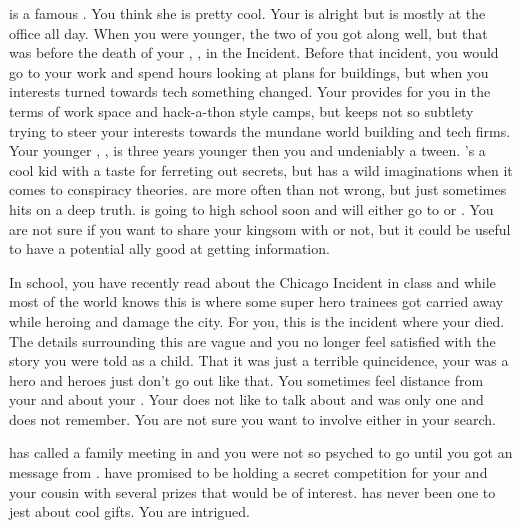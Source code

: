 \documentclass[char]{LRSguildcamp1}
\begin{document}
\cGrandma{} is a famous \cGrandma{\villain}. You think she is pretty cool. Your \cArchitect{\parent} is alright but is mostly at the office all day. When you were younger, the two of you got along well, but that was before the death of your \cAS{\parent}, \cAS{}, in the \pCityO{} Incident. Before that incident, you would go to your \cArchitect{\parent} work and spend hours looking at plans for buildings, but when you interests turned towards tech something changed. Your \cArchitect{\parent} provides for you in the terms of work space and hack-a-thon style camps, but keeps not so subtlety trying to steer your interests towards the mundane world building and tech firms. Your younger \cTween{\sibling}, \cTween{}, is three years younger then you and undeniably a tween. \cTween{}'s a cool kid with a taste for ferreting out secrets, but has a wild imaginations when it comes to conspiracy theories. \cTween{\they} are more often than not wrong, but just sometimes hits on a deep truth. \cTween{} is going to high school soon and will either go to \pNormalSchool{} or \pSuperSchool{}. You are not sure if you want to share your kingsom with \cTween{\them} or not, but it could be useful to have a potential ally good at getting information. 

In school, you have recently read about the Chicago Incident in class and while most of the world knows this is where some super hero trainees got carried away while heroing and damage the city. For you, this is the incident where your \cAS{\parent} died. The details surrounding this are vague and you no longer feel satisfied with the story you were told as a child. That it was just a terrible quincidence, your \cAS{} was a hero and heroes just don't go out like that. You sometimes feel distance from your\cArchitect{\parent} and \cTween{} about your \cAS{\parent}. Your \cArchitect{\parent} does not like to talk about \cAS{} and \cTween{} was only one and does not remember. You are not sure you want to involve either in your search.

\cGrandma{} has called a family meeting in \pCityGrandma{} and you were not so psyched to go until you got an message from \cGrandma{}. \cGrandma{\they} have promised to be holding a secret competition for your and your cousin with several prizes that would be of interest. \cGrandma{} has never been one to jest about cool gifts. You are intrigued.  
\end{document}
